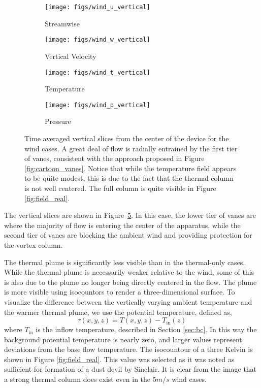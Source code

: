 \begin{figure}[htb]

 \begin{subfigure}{.5\textwidth}
  \centering
  \texttt{[image: figs/wind\_u\_vertical]}
  \caption{Streamwise}
  \label{fig:vt-wind-vert}
 \end{subfigure}%
 \begin{subfigure}{.5\textwidth}
  \centering
  \texttt{[image: figs/wind\_w\_vertical]}
  \caption{Vertical Velocity}
  \label{fig:vz-wind-vert}
 \end{subfigure}%


 \begin{subfigure}{.5\textwidth}
  \centering
  \texttt{[image: figs/wind\_t\_vertical]}
  \caption{Temperature}
  \label{fig:t-wind-vert}
 \end{subfigure}%
 \begin{subfigure}{.5\textwidth}
  \centering
  \texttt{[image: figs/wind\_p\_vertical]}
  \caption{Pressure}
  \label{fig:p-wind-vert}
 \end{subfigure}%

 \caption{Time averaged vertical slices from the center of the device
 for the wind cases. A great deal of flow is radially entrained by the
 first tier of vanes, consistent with the approach proposed in
 Figure \ref{fig:cartoon_vanes}. 
 Notice that while the temperature field appears to
 be quite modest, this is due to the fact that the thermal column is not
 well centered. The full column is quite visible in Figure
 \ref{fig:field_real}.}  
 \label{fig:wind-ver}
\end{figure}

The vertical slices are shown in Figure~\ref{fig:wind-ver}. In this
case, the lower tier of vanes are where the majority of flow is 
entering the center of the apparatus, while the second tier of vanes are
blocking the ambient wind and providing protection for the vortex column. 

The thermal plume is significantly less
visible than in the thermal-only cases. While the
thermal-plume is necessarily weaker relative to the wind, some of this
is also due to the plume no longer being directly centered in the
flow. The plume is more visible using isocountors to render a
three-dimensional surface. 
To visualize the difference between the vertically varying ambient
temperature and the warmer thermal plume, we use the potential
temperature, defined as, 
\begin{equation}
  \tau(x,y,z) = T(x,y,z) -T_{\text{in}}(z) 
   \label{eqn:tau}
\end{equation}
where $T_{\text{in}}$ is the inflow temperature, described
in Section \ref{sec:bc}. In this way the background potential
temperature is nearly zero, and larger values represent deviations from
the base flow temperature. The isocountour of a three Kelvin is 
shown in Figure \ref{fig:field_real}. This value was selected as
it was noted as sufficient for formation of a dust devil by
Sinclair\cite{Sinclair1969}. It is clear from the image that a 
strong thermal column does exist even in the $5 m/s$ wind cases. 

